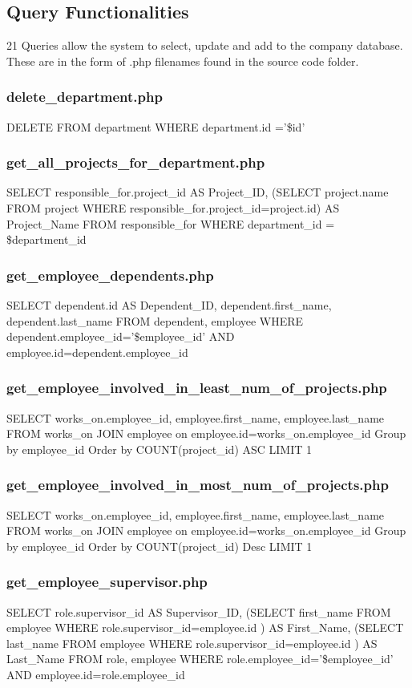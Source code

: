 \documentclass[11pt,letterpaper]{article}
\begin{document}
\subsection{Query Functionalities}
	21 Queries allow the system to select, update and add to the company database. These are in the form of .php filenames found in the source code folder.
	\subsubsection{delete\_department.php}
	DELETE FROM department WHERE department.id ='\$id'
	\subsubsection{get\_all\_projects\_for\_department.php}
	SELECT responsible\_for.project\_id AS Project\_ID, (SELECT project.name FROM project WHERE responsible\_for.project\_id=project.id) AS Project\_Name FROM responsible\_for WHERE department\_id = \$department\_id
	\subsubsection{get\_employee\_dependents.php}
	SELECT dependent.id AS Dependent\_ID, dependent.first\_name, dependent.last\_name FROM dependent, employee WHERE dependent.employee\_id='\$employee\_id' AND employee.id=dependent.employee\_id
	\subsubsection{get\_employee\_involved\_in\_least\_num\_of\_projects.php}
	SELECT works\_on.employee\_id, employee.first\_name, employee.last\_name
	FROM works\_on
	JOIN employee
	on employee.id=works\_on.employee\_id
	Group by employee\_id
	Order by COUNT(project\_id) ASC
	LIMIT 1
	\subsubsection{get\_employee\_involved\_in\_most\_num\_of\_projects.php}
	SELECT works\_on.employee\_id, employee.first\_name, employee.last\_name
	FROM works\_on
	JOIN employee
	on employee.id=works\_on.employee\_id
	Group by employee\_id
	Order by COUNT(project\_id) Desc
	LIMIT 1
	\subsubsection{get\_employee\_supervisor.php}
	SELECT role.supervisor\_id AS Supervisor\_ID, (SELECT first\_name FROM employee WHERE role.supervisor\_id=employee.id ) AS First\_Name, (SELECT last\_name FROM employee WHERE role.supervisor\_id=employee.id ) AS Last\_Name FROM role, employee WHERE role.employee\_id='\$employee\_id' AND employee.id=role.employee\_id
\end{document}
